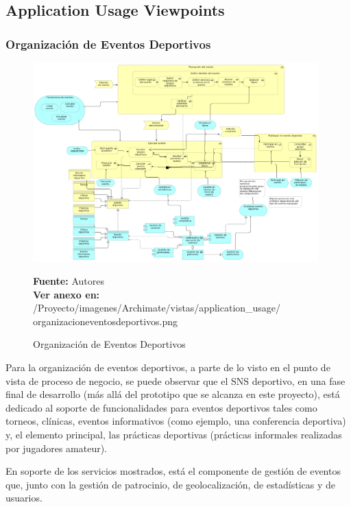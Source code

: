 \subsection{Application Usage Viewpoints}

\subsubsection{Organización de Eventos Deportivos}

\begin{figure}[!htb]
  \begin{center}
    \includegraphics[width=11cm]{./imagenes/Archimate/vistas/application_usage/organizacioneventosdeportivos.png}
    \caption{Organización de Eventos Deportivos}
    \label{fig:au_organizacion_eventos_deportivos}
    \textbf{Fuente:}  Autores \\
    \textbf{Ver anexo en:} /Proyecto/imagenes/Archimate/vistas/application\_usage/
    organizacioneventosdeportivos.png
  \end{center}
\end{figure}

Para la organización de eventos deportivos, a parte de lo visto en el punto de vista de proceso de negocio, se puede observar que el SNS deportivo, en una fase final de desarrollo (más allá del prototipo que se alcanza en este proyecto), está dedicado al soporte de funcionalidades para eventos deportivos tales como torneos, clínicas, eventos informativos (como ejemplo, una conferencia deportiva) y, el elemento principal, las prácticas deportivas (prácticas informales realizadas por jugadores amateur).

En soporte de los servicios mostrados, está el componente de gestión de eventos que, junto con la gestión de patrocinio, de geolocalización, de estadísticas y de usuarios.

